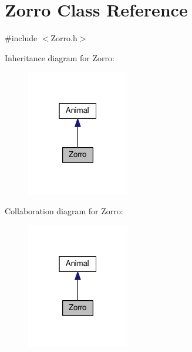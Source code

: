\hypertarget{classZorro}{}\section{Zorro Class Reference}
\label{classZorro}


{\ttfamily \#include $<$Zorro.\+h$>$}



Inheritance diagram for Zorro\+:
\nopagebreak
\begin{figure}[H]
\begin{center}
\leavevmode
\includegraphics[width=127pt]{classZorro__inherit__graph}
\end{center}
\end{figure}


Collaboration diagram for Zorro\+:
\nopagebreak
\begin{figure}[H]
\begin{center}
\leavevmode
\includegraphics[width=127pt]{classZorro__coll__graph}
\end{center}
\end{figure}
